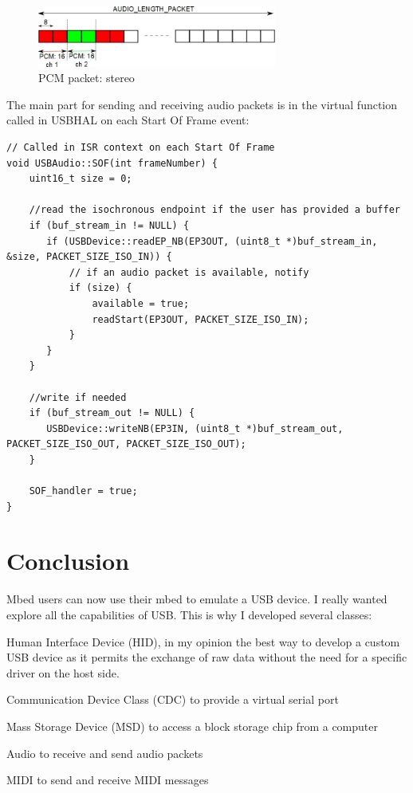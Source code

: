 \documentclass[pdftex,10pt,a4paper]{report}
\newenvironment{packed_item}{
\begin{itemize}
  \setlength{\itemsep}{1pt}
  \setlength{\parskip}{0pt}
  \setlength{\parsep}{0pt}
}{\end{itemize}}
\begin{document}
\begin{figure}[h!]
		\centering
		\includegraphics[width=0.7\textwidth]{./pcm_stereo.jpg}
		\caption{PCM packet: stereo}
		\label{PCM packet: stereo}
\end{figure}


The main part for sending and receiving audio packets is in the virtual function called in USBHAL on each Start Of Frame event:
\begin{lstlisting}[label=Audio packets management in SOF events,caption=Audio packets management in SOF events]
// Called in ISR context on each Start Of Frame
void USBAudio::SOF(int frameNumber) {
    uint16_t size = 0;
    
    //read the isochronous endpoint if the user has provided a buffer
    if (buf_stream_in != NULL) {
       if (USBDevice::readEP_NB(EP3OUT, (uint8_t *)buf_stream_in, &size, PACKET_SIZE_ISO_IN)) {
           // if an audio packet is available, notify
           if (size) {
               available = true;
               readStart(EP3OUT, PACKET_SIZE_ISO_IN);
           }
       }
    }
    
    //write if needed
    if (buf_stream_out != NULL) {
       USBDevice::writeNB(EP3IN, (uint8_t *)buf_stream_out, PACKET_SIZE_ISO_OUT, PACKET_SIZE_ISO_OUT);
    }

    SOF_handler = true;
}
\end{lstlisting}

\section{Conclusion}
Mbed users can now use their mbed to emulate a USB device. I really wanted explore all the capabilities of USB. This is why I developed several classes:
\begin{packed_item}
	\item Human Interface Device (HID), in my opinion the best way to develop a custom USB device as it permits the exchange of raw data without the need for a specific driver on the host side.
	\item Communication Device Class (CDC) to provide a virtual serial port
	\item Mass Storage Device (MSD) to access a block storage chip from a computer
	\item Audio to receive and send audio packets
	\item MIDI to send and receive MIDI messages
\end{packed_item}
\end{document}
